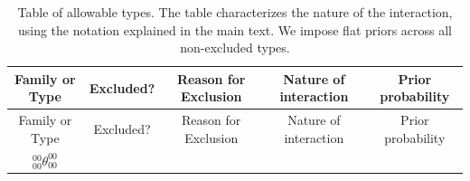 \documentclass[12pt,]{book}
\begin{document}
\begin{longtable}[]{@{}ccccc@{}}
\caption{\label{tab:apptypes2} Table of allowable types. The table characterizes the nature of the interaction, using the notation explained in the main text. We impose flat priors across all non-excluded types.}\tabularnewline
\toprule
\begin{minipage}[b]{0.24\columnwidth}\centering
Family or Type\strut
\end{minipage} & \begin{minipage}[b]{0.09\columnwidth}\centering
Excluded?\strut
\end{minipage} & \begin{minipage}[b]{0.20\columnwidth}\centering
Reason for Exclusion\strut
\end{minipage} & \begin{minipage}[b]{0.18\columnwidth}\centering
Nature of interaction\strut
\end{minipage} & \begin{minipage}[b]{0.15\columnwidth}\centering
Prior probability\strut
\end{minipage}\tabularnewline
\midrule
\endfirsthead
\toprule
\begin{minipage}[b]{0.24\columnwidth}\centering
Family or Type\strut
\end{minipage} & \begin{minipage}[b]{0.09\columnwidth}\centering
Excluded?\strut
\end{minipage} & \begin{minipage}[b]{0.20\columnwidth}\centering
Reason for Exclusion\strut
\end{minipage} & \begin{minipage}[b]{0.18\columnwidth}\centering
Nature of interaction\strut
\end{minipage} & \begin{minipage}[b]{0.15\columnwidth}\centering
Prior probability\strut
\end{minipage}\tabularnewline
\midrule
\endhead
\begin{minipage}[t]{0.24\columnwidth}\centering
\(_{00}^{00}\theta_{00}^{00}\)\strut
\end{minipage} & \begin{minipage}[t]{0.09\columnwidth}\centering
\strut
\end{minipage} & \begin{minipage}[t]{0.20\columnwidth}\centering
\strut
\end{minipage} & \begin{minipage}[t]{0.18\columnwidth}\centering

\end{minipage}
\end{longtable}
\end{document}
